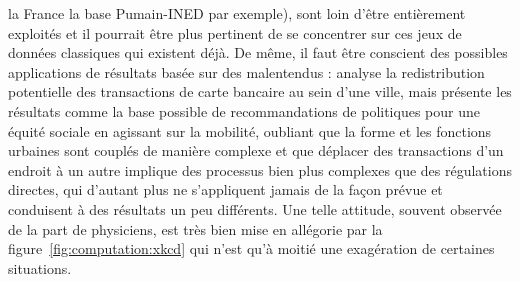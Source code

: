 {la France la base Pumain-INED par exemple), sont loin d'être entièrement exploités et il pourrait être plus pertinent de se concentrer sur ces jeux de données classiques qui existent déjà. De même, il faut être conscient des possibles applications de résultats basée sur des malentendus : \cite{louail2016crowdsourcing} analyse la redistribution potentielle des transactions de carte bancaire au sein d'une ville, mais présente les résultats comme la base possible de recommandations de politiques pour une équité sociale en agissant sur la mobilité, oubliant que la forme et les fonctions urbaines sont couplés de manière complexe et que déplacer des transactions d'un endroit à un autre implique des processus bien plus complexes que des régulations directes, qui d'autant plus ne s'appliquent jamais de la façon prévue et conduisent à des résultats un peu différents. Une telle attitude, souvent observée de la part de physiciens, est très bien mise en allégorie par la figure~\ref{fig:computation:xkcd} qui n'est qu'à moitié une exagération de certaines situations.
}




